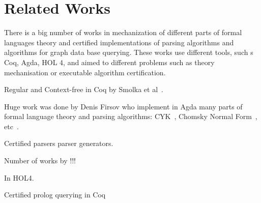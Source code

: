 \section{Related Works}

There is a big number of works in mechanization of different parts of formal languages theory and certified implementations of parsing algorithms and algorithms for graph data base querying. These works use different tools, such s Coq, Agda, HOL 4, and aimed to different problems such as theory mechanisation or executable algorithm certification.

Regular and Context-free in Coq by Smolka et al~\cite{smolka2017regular, smolka2013regular}.

Huge work was done by Denis Firsov who implement in Agda many parts of formal language theory and parsing algorithms: CYK~\cite{!!!}, Chomsky Normal Form~\cite{!!!}, etc~\cite{firsov2016cfl}.

Certified parsers parser generators.

Number of works by !!! 

In HOL4.

Certified prolog querying in Coq~\cite{certifiedPrologGraphQuerying} 


